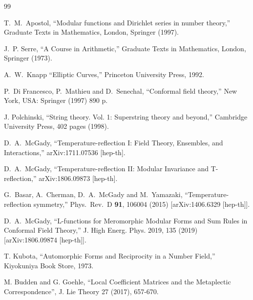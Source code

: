 \documentclass[aps,prd,groupedaddress,preprint,tightenlines,eqsecnum,nofootinbib]{revtex4}
\begin{document}




\begin{thebibliography}{99}

T.~M.~Apostol, 
``Modular functions and Dirichlet series in number theory,''
Graduate Texts in Mathematics, London, Springer (1997).

J.~P. Serre, 
``A Course in Arithmetic,''
Graduate Texts in Mathematics, London, Springer (1973).

A.~W.~Knapp
``Elliptic Curves,''
Princeton University Press, 1992.

P.~Di Francesco, P.~Mathieu and D.~Senechal,  
``Conformal field theory,''
New York, USA: Springer (1997) 890 p.

J. Polchinski, 
``String theory. Vol. 1: Superstring theory and beyond,''
Cambridge University Press, 402 pages (1998).

D.~A.~McGady,
``Temperature-reflection I: Field Theory, Ensembles, and Interactions,'' 
arXiv:1711.07536 [hep-th].

D.~A.~McGady,
``Temperature-reflection II: Modular Invariance and T-reflection,'' 
arXiv:1806.09873 [hep-th].

G.~Basar, A.~Cherman, D.~A.~McGady and M.~Yamazaki,
``Temperature-reflection symmetry,''
Phys.\ Rev.\ D {\bf 91}, 106004 (2015)
[arXiv:1406.6329 [hep-th]].

D.~A.~McGady, ``L-functions for Meromorphic Modular Forms and Sum Rules in Conformal Field Theory,'' 
J. High Energ. Phys. 2019, 135 (2019) %
[arXiv:1806.09874 [hep-th]].

T. Kubota, ``Automorphic Forms and Reciprocity in a Number Field,'' 
Kiyokuniya Book Store, 1973.

M. Budden and G. Goehle, ``Local Coefficient Matrices and the Metaplectic Correspondence'', 
J. Lie Theory 27 (2017), 657-670.



\end{thebibliography}
\end{document}
